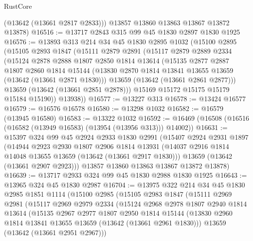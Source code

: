 \begin{lexlean}{RustCore}
\begin{coremodule}
        (@13642 (@13661 @2817 @2833)))
      @13857
      @13860
      @13863
      @13867
      @13872
      @13878)
@16516 := @13717 @2843 @315 @99 @45 @1830 @2897 @1830 @1925
@16576 := @13893
    @313
    @214
    @34
    @45
    @1830
    @2895
    @1032
    (@15100
      @2895
      (@15105
        @2893
        @1847
        (@15111
          @2879
          @2891
          (@15117
            @2879
            @2889
            @2334
            (@15124
              @2878
              @2888
              @1807
              @2850
              @1814
              @13614
              (@15135
                @2877
                @2887
                @1807
                @2860
                @1814
                @15144
                (@13830 @2870 @1814 @13841 @13655 @13659 (@13642 (@13661 @2871 @1830)))
                @13659
                (@13642 (@13661 @2861 @2877)))
              @13659
              (@13642 (@13661 @2851 @2878)))
            @15169
            @15172
            @15175
            @15179
            @15184
            @15190))
        @13938))
@16577 := @13227 @313
@16578 := @13424 @16577
@16579 := @16576 @16578
@16580 := @13298 @1032
@16582 := @16579 (@13945 @16580)
@16583 := @13322 @1032
@16592 := @16469 (@16508 (@16516 (@16582 (@13949 @16583) (@13954 (@13956 @313))) @14002))
@16631 := @15397
    @324
    @99
    @45
    @2924
    @2933
    @1830
    @2991
    (@15407
      @2924
      @2931
      @1897
      (@14944
        @2923
        @2930
        @1807
        @2906
        @1814
        @13931
        (@14037 @2916 @1814 @14048 @13655 @13659 (@13642 (@13661 @2917 @1830)))
        @13659
        (@13642 (@13661 @2907 @2923)))
      @13857
      @13860
      @13863
      @13867
      @13872
      @13878)
@16639 := @13717 @2933 @324 @99 @45 @1830 @2988 @1830 @1925
@16643 := @13965 @324 @45 @1830 @2987
@16704 := @13975
    @322
    @214
    @34
    @45
    @1830
    @2985
    @1851
    @1114
    (@15100
      @2985
      (@15105
        @2983
        @1847
        (@15111
          @2969
          @2981
          (@15117
            @2969
            @2979
            @2334
            (@15124
              @2968
              @2978
              @1807
              @2940
              @1814
              @13614
              (@15135
                @2967
                @2977
                @1807
                @2950
                @1814
                @15144
                (@13830 @2960 @1814 @13841 @13655 @13659 (@13642 (@13661 @2961 @1830)))
                @13659
                (@13642 (@13661 @2951 @2967)))

\end{coremodule}
\end{lexlean}
